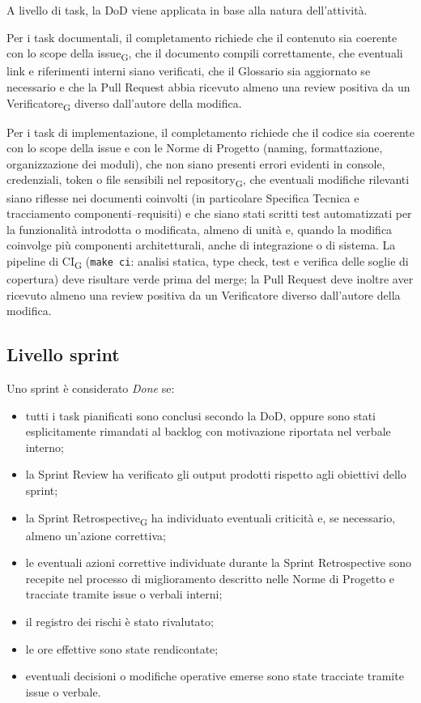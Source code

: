 A livello di task, la DoD viene applicata in base alla natura dell'attività.

Per i task documentali, il completamento richiede che il contenuto sia coerente
con lo scope della issue\textsubscript{G}, che il documento compili correttamente,
che eventuali link e riferimenti interni siano verificati, che il Glossario sia
aggiornato se necessario e che la Pull Request abbia ricevuto almeno una review
positiva da un Verificatore\textsubscript{G} diverso dall'autore della modifica.

Per i task di implementazione, il completamento richiede che il codice sia
coerente con lo scope della issue e con le Norme di Progetto (naming,
formattazione, organizzazione dei moduli), che non siano presenti errori
evidenti in console, credenziali, token o file sensibili nel
repository\textsubscript{G}, che eventuali modifiche rilevanti siano riflesse
nei documenti coinvolti (in particolare Specifica Tecnica e tracciamento
componenti--requisiti) e che siano stati scritti test automatizzati per la
funzionalità introdotta o modificata, almeno di unità e, quando la modifica
coinvolge più componenti architetturali, anche di integrazione o di sistema.
La pipeline di CI\textsubscript{G} (\texttt{make ci}: analisi statica, type
check, test e verifica delle soglie di copertura) deve risultare verde prima
del merge; la Pull Request deve inoltre aver ricevuto almeno una review
positiva da un Verificatore diverso dall'autore della modifica.

\subsection{Livello sprint}
\label{sec:dod-sprint}

Uno sprint è considerato \textit{Done} se:
\begin{itemize}
\item tutti i task pianificati sono conclusi secondo la DoD, oppure sono
stati esplicitamente rimandati al backlog con motivazione riportata
nel verbale interno;
\item la Sprint Review ha verificato gli output prodotti rispetto agli
obiettivi dello sprint;
\item la Sprint Retrospective\textsubscript{G} ha individuato eventuali
criticità e, se necessario, almeno un'azione correttiva;
\item le eventuali azioni correttive individuate durante la Sprint
Retrospective sono recepite nel processo di miglioramento descritto
nelle Norme di Progetto e tracciate tramite issue o verbali interni;
\item il registro dei rischi è stato rivalutato;
\item le ore effettive sono state rendicontate;
\item eventuali decisioni o modifiche operative emerse sono state tracciate
tramite issue o verbale.
\end{itemize}
